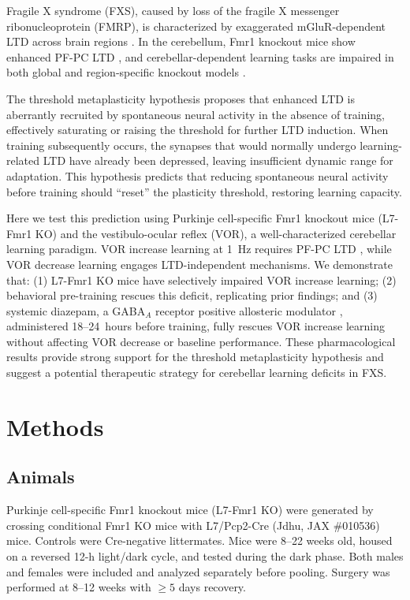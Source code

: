 \documentclass[11pt]{article}
\begin{document}
Fragile X syndrome (FXS), caused by loss of the fragile X messenger ribonucleoprotein (FMRP), is characterized by exaggerated mGluR-dependent LTD across brain regions \citep{bear2004synaptic, huber2002altered, bassell2008fragile}. In the cerebellum, Fmr1 knockout mice show enhanced PF-PC LTD \citep{koekkoek2005deletion}, and cerebellar-dependent learning tasks are impaired in both global and region-specific knockout models \citep{darnell2011fmrp}.

The threshold metaplasticity hypothesis \citep{abraham2008metaplasticity, bienenstock1982theory} proposes that enhanced LTD is aberrantly recruited by spontaneous neural activity in the absence of training, effectively saturating or raising the threshold for further LTD induction. When training subsequently occurs, the synapses that would normally undergo learning-related LTD have already been depressed, leaving insufficient dynamic range for adaptation. This hypothesis predicts that reducing spontaneous neural activity before training should ``reset'' the plasticity threshold, restoring learning capacity.

Here we test this prediction using Purkinje cell-specific Fmr1 knockout mice (L7-Fmr1 KO) and the vestibulo-ocular reflex (VOR), a well-characterized cerebellar learning paradigm. VOR increase learning at 1~Hz requires PF-PC LTD \citep{boyden2004cerebellum, boyden2006mechanisms}, while VOR decrease learning engages LTD-independent mechanisms. We demonstrate that: (1) L7-Fmr1 KO mice have selectively impaired VOR increase learning; (2) behavioral pre-training rescues this deficit, replicating prior findings; and (3) systemic diazepam, a GABA$_A$ receptor positive allosteric modulator \citep{rudolph2004beyond}, administered 18--24~hours before training, fully rescues VOR increase learning without affecting VOR decrease or baseline performance. These pharmacological results provide strong support for the threshold metaplasticity hypothesis and suggest a potential therapeutic strategy for cerebellar learning deficits in FXS.

\section{Methods}

\subsection{Animals}

Purkinje cell-specific Fmr1 knockout mice (L7-Fmr1 KO) were generated by crossing conditional Fmr1 KO mice with L7/Pcp2-Cre (Jdhu, JAX \#010536) mice. Controls were Cre-negative littermates. Mice were 8--22 weeks old, housed on a reversed 12-h light/dark cycle, and tested during the dark phase. Both males and females were included and analyzed separately before pooling. Surgery was performed at 8--12 weeks with $\geq 5$ days recovery.
\end{document}
